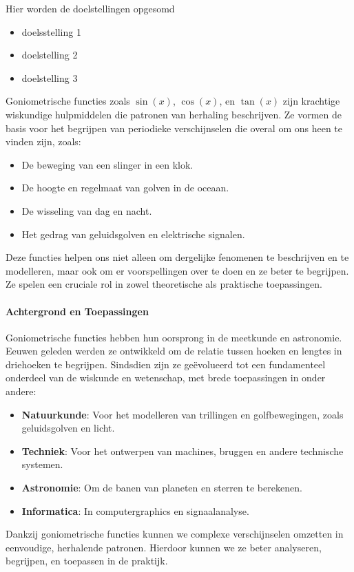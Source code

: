 \documentclass{ximera}
\begin{document}
\begin{template}
Hier worden de doelstellingen opgesomd
\begin{itemize}
    \item doelsstelling 1
    \item doelstelling 2
    \item doelstelling 3
\end{itemize}
\end{template}


Goniometrische functies zoals \(\sin(x)\), \(\cos(x)\), en \(\tan(x)\) zijn krachtige wiskundige hulpmiddelen die patronen van herhaling beschrijven. Ze vormen de basis voor het begrijpen van periodieke verschijnselen die overal om ons heen te vinden zijn, zoals:
\begin{itemize}
    \item De beweging van een slinger in een klok.
    \item De hoogte en regelmaat van golven in de oceaan.
    \item De wisseling van dag en nacht.
    \item Het gedrag van geluidsgolven en elektrische signalen.
\end{itemize}
Deze functies helpen ons niet alleen om dergelijke fenomenen te beschrijven en te modelleren, maar ook om er voorspellingen over te doen en ze beter te begrijpen. Ze spelen een cruciale rol in zowel theoretische als praktische toepassingen.

\paragraph*{Achtergrond en Toepassingen} 
Goniometrische functies hebben hun oorsprong in de meetkunde en astronomie. Eeuwen geleden werden ze ontwikkeld om de relatie tussen hoeken en lengtes in driehoeken te begrijpen. Sindsdien zijn ze geëvolueerd tot een fundamenteel onderdeel van de wiskunde en wetenschap, met brede toepassingen in onder andere:

\begin{itemize}
    \item \textbf{Natuurkunde}: Voor het modelleren van trillingen en golfbewegingen, zoals geluidsgolven en licht.
    \item \textbf{Techniek}: Voor het ontwerpen van machines, bruggen en andere technische systemen.
    \item \textbf{Astronomie}: Om de banen van planeten en sterren te berekenen.
    \item \textbf{Informatica}: In computergraphics en signaalanalyse.
\end{itemize}

Dankzij goniometrische functies kunnen we complexe verschijnselen omzetten in eenvoudige, herhalende patronen. Hierdoor kunnen we ze beter analyseren, begrijpen, en toepassen in de praktijk.
\end{document}
